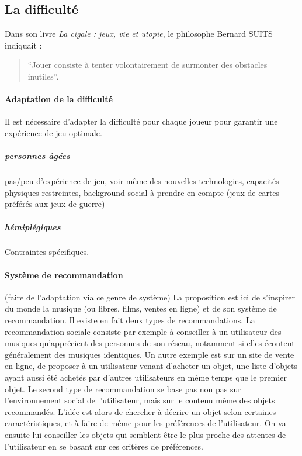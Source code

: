 \subsection{La difficulté}
Dans son livre \emph{La cigale : jeux, vie et utopie}, le philosophe Bernard SUITS indiquait : \begin{quote}{“Jouer consiste à tenter volontairement de surmonter des obstacles inutiles”}.  \end{quote}
		
	\paragraph{Adaptation de la difficulté\\}
Il est nécessaire d'adapter la difficulté pour chaque joueur pour garantir une expérience de jeu optimale.			
		\subparagraph{personnes âgées\\}
pas/peu d'expérience de jeu, voir même des nouvelles technologies, capacités physiques restreintes, background social à prendre en compte (jeux de cartes préférés aux jeux de guerre)
		\subparagraph{hémiplégiques\\}		
Contraintes spécifiques.	
				
	\paragraph{Système de recommandation \\}
(faire de l'adaptation via ce genre de système)
La proposition est ici de s'inspirer du monde la musique (ou libres, films, ventes en ligne) et de son système de recommandation. Il existe en fait deux types de recommandations. La recommandation sociale consiste par exemple à conseiller à un utilisateur des musiques qu'apprécient des personnes de son réseau, notamment si elles écoutent généralement des musiques identiques. Un autre exemple est sur un site de vente en ligne, de proposer à un utilisateur venant d'acheter un objet, une liste d'objets ayant aussi été achetés par d'autres utilisateurs en même temps que le premier objet.
Le second type de recommandation se base pas non pas sur l'environnement social de l'utilisateur, mais sur le contenu même des objets recommandés. L'idée est alors de chercher à décrire un objet selon certaines caractéristiques, et à faire de même pour les préférences de l'utilisateur. On va ensuite lui conseiller les objets qui semblent être le plus proche des attentes de l'utilisateur en se basant sur ces critères de préférences. 
